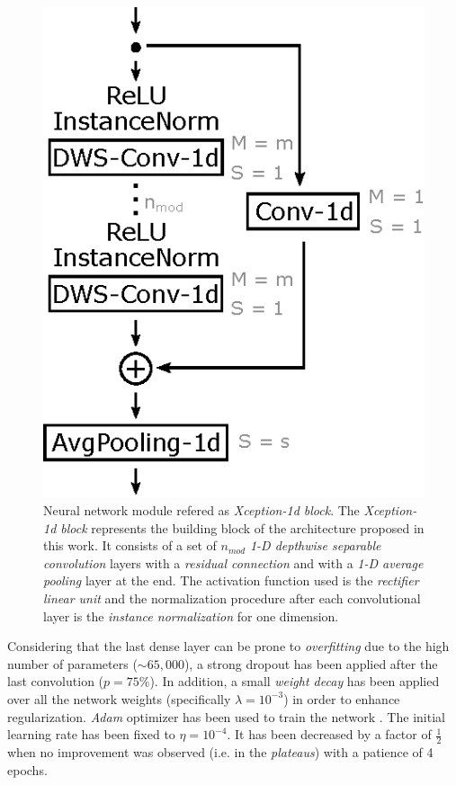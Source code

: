 \documentclass[review]{elsarticle}
\begin{document}
\begin{figure}[h]
	\centering
	\includegraphics[width=0.4\linewidth]{img/xception_module.eps}
	\caption{Neural network module refered as \textit{Xception-1d block}. The \textit{Xception-1d block} represents the building block of the architecture proposed in this work. It consists of a set of $n_{mod}$ \textit{1-D depthwise separable convolution} layers with a \textit{residual connection} and with a \textit{1-D average pooling} layer at the end. The activation function used is the \textit{rectifier linear unit} and the normalization procedure after each convolutional layer is the \textit{instance normalization} for one dimension.}
	\label{fig:xceptionmodule}
\end{figure}



Considering that the last dense layer can be prone to \textit{overfitting} due to the high number of parameters ($\sim 65,000$), a strong dropout \cite{Srivastava2014, Goodfellow2016} has been applied after the last convolution ($p = 75\%$). In addition, a small \textit{weight decay} \cite{Krogh1991, Haykin1998, Goodfellow2016} has been applied over all the network weights (specifically $\lambda = 10^{-3}$) in order to enhance regularization. \textit{Adam} optimizer has been used to train the network \cite{Kingma14}. The initial learning rate has been fixed to $\eta = 10^{-4}$. It has been decreased by a factor of $\frac{1}{2}$ when no improvement was observed (i.e. in the \textit{plateaus}) with a patience of 4 epochs.
\end{document}
